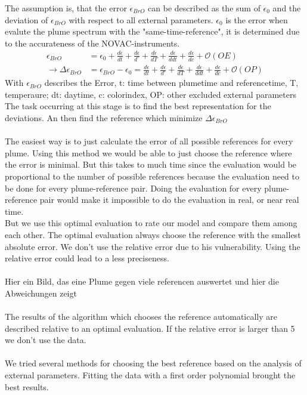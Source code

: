 \documentclass  [
  paper    = a4,
  BCOR     = 10mm,
  twoside,
  fontsize = 12pt,
  fleqn,
  toc      = bibnumbered,
  toc      = listofnumbered,
  numbers  = noendperiod,
  headings = normal,
  listof   = leveldown,
  version  = 3.03
]                                       {scrreprt}
\begin{document}
	The assumption is, that the  error $\epsilon_{BrO}$ can be described as the sum of $\epsilon_{0}$ and the deviation of $\epsilon_{BrO}$ with respect to all external parameters. $\epsilon_{0}$ is the  error when evalute the plume spectrum with the "same-time-reference", it is determined due to the accurateness of the NOVAC-instruments.
	\begin{align}
		\epsilon_{BrO} &=  \epsilon_{0}+\frac{d\epsilon}{dt}+\frac{d\epsilon}{d ^{\circ}}+\frac{d\epsilon}{dT}+\frac{d\epsilon}{ddt} +\frac{d\epsilon}{dc} + \mathcal{O}\left(OE\right) \\
		\rightarrow \Delta \epsilon_{BrO} &= \epsilon_{BrO} - \epsilon_{0} =\frac{d\epsilon}{dt}+\frac{d\epsilon}{d ^{\circ}}+\frac{d\epsilon}{dT}+\frac{d\epsilon}{ddt} +\frac{d\epsilon}{dc} + \mathcal{O}\left(OP\right) 
		\label{calc:err}
	\end{align}
	With $\epsilon_{BrO}$ describes the  Error, t: time between plumetime and referencetime, T, temperaure; dt: daytime, c: colorindex, OP: other excluded external parameters\\
	The task occurring at this stage is to find the best representation for the deviations. An then find the reference which minimize $\Delta \epsilon_{BrO} $\\
	\\
	The easiest way is to just calculate the  error of all possible references for every plume. Using this method we would be able to just choose the reference where the  error is minimal. But this takes to much time since the evaluation would be proportional to the number of possible references because the evaluation need to be done for every plume-reference pair. Doing the evaluation for every plume-reference pair would make it impossible to do the evaluation in real, or near real time.\\
	But we use this optimal evaluation to rate our model and compare them among each other. The optimal evaluation always choose the reference with the smallest absolute error. We don't use the relative error due to his vulnerability. Using the relative error could lead to a less preciseness.\\
	\\
	Hier ein Bild, das eine Plume gegen viele referencen auswertet und hier die Abweichungen zeigt\\
	\\
	The results of the algorithm which chooses the reference automatically are described relative to an optimal evaluation. If the relative error is larger than 5 we don't use the data.\\
	\\
	We tried several methods for choosing the best reference based on the analysis of external parameters. Fitting the data with a first order polynomial brought the best results.
	
\end{document}
